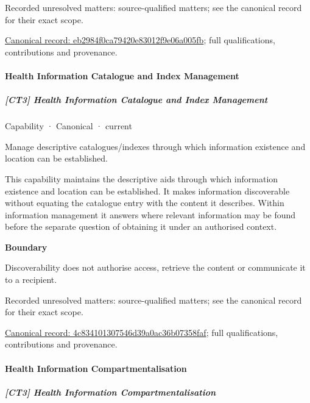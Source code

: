 {\small Recorded unresolved matters: source-qualified matters; see the canonical record for their exact scope.}\par
{\footnotesize \href{../../../../continuum/strategy/capability/eb2984f0ca79420e83012f9e06a005fb.md}{Canonical record: eb2984f0ca79420e83012f9e06a005fb}; full qualifications, contributions and provenance.}\par
\paragraph{Health Information Catalogue and Index Management}

\subparagraph{[CT3] Health Information Catalogue and Index Management}

\label{element:4c834101307546d39a0ac36b07358faf}
{\small Capability · Canonical · current}\par

Manage descriptive catalogues/indexes through which information existence and location can be established.



This capability maintains the descriptive aids through which information existence and location can be established. It makes information discoverable without equating the catalogue entry with the content it describes. Within information management it answers where relevant information may be found before the separate question of obtaining it under an authorised context.



\textbf{Boundary}



Discoverability does not authorise access, retrieve the content or communicate it to a recipient.


{\small Recorded unresolved matters: source-qualified matters; see the canonical record for their exact scope.}\par
{\footnotesize \href{../../../../continuum/strategy/capability/4c834101307546d39a0ac36b07358faf.md}{Canonical record: 4c834101307546d39a0ac36b07358faf}; full qualifications, contributions and provenance.}\par
\paragraph{Health Information Compartmentalisation}

\subparagraph{[CT3] Health Information Compartmentalisation}

